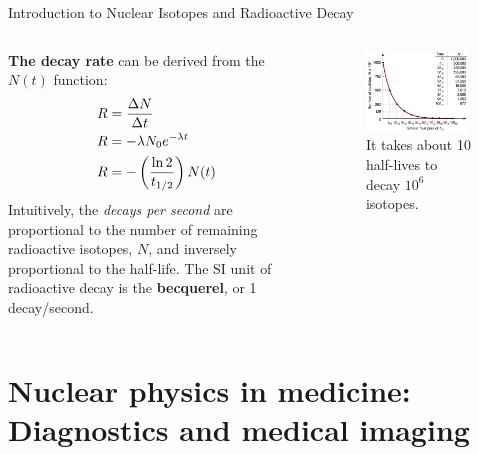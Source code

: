 \documentclass{beamer}
\begin{document}
\begin{frame}{Introduction to Nuclear Isotopes and Radioactive Decay}
\begin{columns}[T]
\begin{column}{0.5\textwidth}
\small
\textbf{\alert{The decay rate}} can be derived from the $N(t)$ function:
\begin{align}
R &= \frac{\Delta N}{\Delta t} \\
R &=-\lambda N_0 e^{-\lambda t} \\
R &= -\left(\frac{\ln 2}{t_{\rm 1/2}}\right)N(t)
\end{align}
Intuitively, the \textit{decays per second} are proportional to the number of remaining radioactive isotopes, $N$, and inversely proportional to the half-life.  The SI unit of radioactive decay is the \textbf{becquerel}, or 1 decay/second.
\end{column}
\begin{column}{0.5\textwidth}
\begin{figure}
\centering
\includegraphics[width=0.95\textwidth]{figures/half-life.png}
\caption{\label{fig:radio9} It takes about 10 half-lives to decay $10^6$ isotopes.}
\end{figure}
\end{column}
\end{columns}
\end{frame}

\section{Nuclear physics in medicine: Diagnostics and medical imaging}
\end{document}
